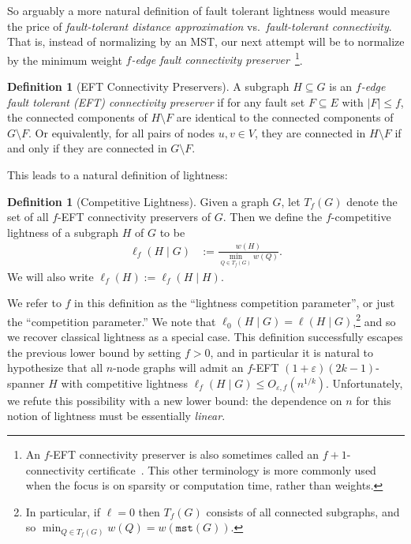 \documentclass{article}
\theoremstyle{plain}
\theoremstyle{definition}
\newtheorem{definition}[theorem]{Definition}
\newcommand{\eps}{\varepsilon}
\newcommand{\mst}{\texttt{mst}}
\begin{document}
So arguably a more natural definition of fault tolerant lightness would measure the price of \emph{fault-tolerant distance approximation} vs.\ \emph{fault-tolerant connectivity}.
That is, instead of normalizing by an MST, our next attempt will be to normalize by 
the minimum weight \emph{$f$-edge fault connectivity preserver}~\cite{NI92,NI08, DKK22,DKKN23}\footnote{An $f$-EFT connectivity preserver is also sometimes called an $f+1$-connectivity certificate~\cite{NI92,NI08}.  This other terminology is more commonly used when the focus is on sparsity or computation time, rather than weights.}.
\begin{definition} [EFT Connectivity Preservers]
A subgraph $H \subseteq G$ is an \emph{$f$-edge fault tolerant (EFT) connectivity preserver}
if for any fault set $F \subseteq E$ with $|F| \leq f$, the connected components of $H \setminus F$ are identical to the connected components of $G \setminus F$.
Or equivalently, for all pairs of nodes $u, v \in V$, they are connected in $H \setminus F$ if and only if they are connected in $G \setminus F$.  
\end{definition}

This leads to a natural definition of lightness:

\begin{definition} [Competitive Lightness] \label{def:complight}
    Given a graph $G$, let $T_f(G)$ denote the set of all $f$-EFT connectivity preservers of $G$.  Then we define the $f$-competitive lightness of a subgraph $H$ of $G$ to be 
    \begin{align*}
        \ell_f(H \mid G) &:= \frac{w(H)}{\min_{Q \in {T_f(G)}} w(Q)}.
    \end{align*}
    We will also write $\ell_f(H) := \ell_f(H \mid H)$.
\end{definition}

We refer to $f$ in this definition as the ``lightness competition parameter'', or just the ``competition parameter.''
We note that $\ell_0(H \mid G) = \ell(H \mid G)$,\footnote{In particular, if $\ell = 0$ then $T_f(G)$ consists of all connected subgraphs, and so $\min_{Q \in T_f(G)} w(Q) = w(\mst(G))$.} and so we recover classical lightness as a special case.  
This definition successfully escapes the previous lower bound
by setting $f > 0$, and in particular it is natural to hypothesize that all $n$-node graphs will admit an $f$-EFT $(1+\eps)(2k-1)$-spanner $H$ with competitive lightness $\ell_f(H \mid G) \le O_{\eps, f}(n^{1/k})$.
Unfortunately, we refute this possibility with a new lower bound: the dependence on $n$ for this notion of lightness must be essentially \emph{linear}.
\end{document}
